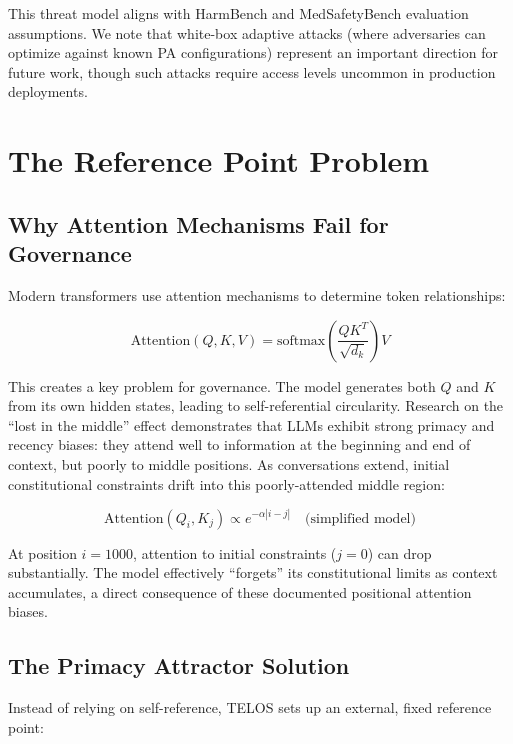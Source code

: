 \documentclass[11pt,a4paper]{article}
\begin{document}
This threat model aligns with HarmBench and MedSafetyBench evaluation assumptions. We note that white-box adaptive attacks (where adversaries can optimize against known PA configurations) represent an important direction for future work, though such attacks require access levels uncommon in production deployments.

\section{The Reference Point Problem}

\subsection{Why Attention Mechanisms Fail for Governance}

Modern transformers use attention mechanisms to determine token relationships:

\begin{equation}
\text{Attention}(Q,K,V) = \text{softmax}\left(\frac{QK^T}{\sqrt{d_k}}\right)V
\end{equation}

This creates a key problem for governance. The model generates both $Q$ and $K$ from its own hidden states, leading to self-referential circularity. Research on the ``lost in the middle'' effect \citep{liu2024lost} demonstrates that LLMs exhibit strong primacy and recency biases: they attend well to information at the beginning and end of context, but poorly to middle positions. As conversations extend, initial constitutional constraints drift into this poorly-attended middle region:

\begin{equation}
\text{Attention}(Q_i, K_j) \propto e^{-\alpha|i-j|} \quad \text{(simplified model)}
\end{equation}

At position $i=1000$, attention to initial constraints ($j=0$) can drop substantially. The model effectively ``forgets'' its constitutional limits as context accumulates, a direct consequence of these documented positional attention biases.

\subsection{The Primacy Attractor Solution}

Instead of relying on self-reference, TELOS sets up an external, fixed reference point:
\end{document}
